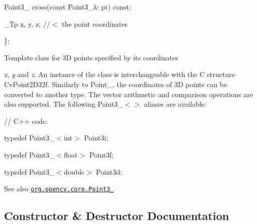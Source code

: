 {\ttfamily }

{\ttfamily }

{\ttfamily Point3\+\_\+ cross(const Point3\+\_\+\& pt) const;}

{\ttfamily }

{\ttfamily }

{\ttfamily \+\_\+\+Tp x, y, z; //$<$ the point coordinates}

{\ttfamily }

{\ttfamily }

{\ttfamily \};}

{\ttfamily }

{\ttfamily }

{\ttfamily Template class for 3D points specified by its coordinates }

{\itshape x}, {\itshape y} and {\itshape z}. An instance of the class is interchangeable with the C structure {\ttfamily Cv\+Point2\+D32f}. Similarly to {\ttfamily Point\+\_\+}, the coordinates of 3D points can be converted to another type. The vector arithmetic and comparison operations are also supported. The following {\ttfamily Point3\+\_\+$<$$>$} aliases are available\+: {\ttfamily }

{\ttfamily }

{\ttfamily }

{\ttfamily // C++ code\+:}

{\ttfamily }

{\ttfamily }

{\ttfamily typedef Point3\+\_\+$<$int$>$ Point3i;}

{\ttfamily }

{\ttfamily }

{\ttfamily typedef Point3\+\_\+$<$float$>$ Point3f;}

{\ttfamily }

{\ttfamily }

{\ttfamily typedef Point3\+\_\+$<$double$>$ Point3d;}

{\ttfamily }

{\ttfamily \begin{DoxySeeAlso}{See also}
\href{http://docs.opencv.org/modules/core/doc/basic_structures.html#point3}{\tt org.\+opencv.\+core.\+Point3\+\_\+} 
\end{DoxySeeAlso}
}

\subsection{Constructor \& Destructor Documentation}
\mbox{\label{classorg_1_1opencv_1_1core_1_1_point3_ae57de7c64ddb712748d49f7314b59219}} 
